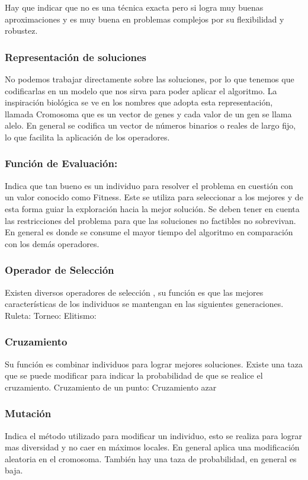 Hay que indicar que no es una técnica exacta pero si logra muy buenas aproximaciones y es muy buena en problemas complejos por su flexibilidad y robustez. 


\subsubsection{Representación de soluciones}
No podemos trabajar directamente sobre las soluciones, por lo que tenemos que codificarlas en un modelo que nos sirva para poder aplicar el algoritmo.
La inspiración biológica se ve en los nombres que adopta esta representación, llamada Cromosoma que es un vector de genes y cada valor de un gen se llama alelo.
En general se codifica un vector de números binarios o reales de largo fijo, lo que facilita la aplicación de los operadores.

\subsubsection{Función de Evaluación:} 
Indica que tan bueno es un individuo para resolver el problema en cuestión con un valor conocido como Fitness. Este se utiliza para seleccionar a los mejores y de esta forma guiar la exploración hacia la mejor solución.
Se deben tener en cuenta las restricciones del problema para que las soluciones no factibles no sobrevivan.
En general es donde se consume el mayor tiempo del algoritmo en comparación con los demás operadores.

\subsubsection{Operador de Selección}
Existen diversos operadores de selección , su función es que las mejores características de los individuos se mantengan en las siguientes generaciones.
Ruleta:
Torneo:
Elitismo:

\subsubsection{Cruzamiento}
Su función es combinar individuos para lograr mejores soluciones. 
Existe una taza que se puede modificar para indicar la probabilidad de que se realice el cruzamiento.
Cruzamiento de un punto:
Cruzamiento azar

\subsubsection{Mutación} 
Indica el método utilizado para modificar un individuo, esto se realiza para lograr mas diversidad y no caer en máximos locales. En general aplica una modificación aleatoria en el cromosoma.
También hay una taza de probabilidad, en general es baja.

